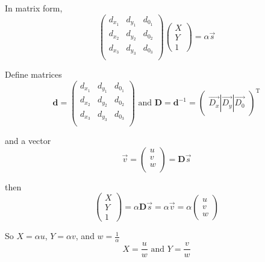 \documentclass{article}
\begin{document}
In matrix form,
\begin{equation}
\begin{pmatrix}
d_{x_1} &d_{y_1} &d_{0_1} \\
d_{x_2} &d_{y_2} &d_{0_2} \\
d_{x_3} &d_{y_3} &d_{0_3} \\
\end{pmatrix}
\begin{pmatrix}
X \\ Y \\ 1
\end{pmatrix} = \alpha \vec{s}
\end{equation}

Define matrices
\begin{equation}
\mathbf{d} = 
\begin{pmatrix}
d_{x_1} &d_{y_1} &d_{0_1} \\
d_{x_2} &d_{y_2} &d_{0_2} \\
d_{x_3} &d_{y_3} &d_{0_3} \\
\end{pmatrix} \textrm{ and }
\mathbf{D} = \mathbf{d}^{-1} = 
\begin{pmatrix}
\vec{D_x} | \vec{D_y} | \vec{D_0}
\end{pmatrix}^\mathrm{T}
\end{equation}

and a vector
\begin{equation}
\vec{v} = \begin{pmatrix}
u \\
v \\
w \\
\end{pmatrix} = \mathbf{D} \vec{s}
\end{equation}

then
\begin{equation}
\begin{pmatrix}
X \\ 
Y \\ 
1
\end{pmatrix} = \alpha \mathbf{D} \vec{s} = \alpha \vec{v} = \alpha
\begin{pmatrix}
u \\
v \\
w 
\end{pmatrix} 
\end{equation}

So $ X = \alpha u $, $ Y = \alpha v$, and $ w = \frac{1}{\alpha}$
\begin{equation}
X = \frac{u}{w} \textrm{ and } Y = \frac{v}{w}
\end{equation}
\end{document}
